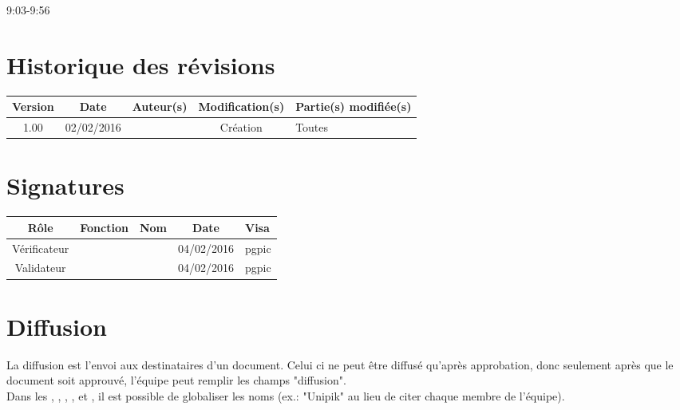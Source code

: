 \documentclass [a4paper] {article}
\begin{document}
\rhead{}
\hfill   
\hfill 	9:03-9:56 				%



\section*{Historique des révisions}
\begin{center}
			\begin{tabular}{| c | c | c | c | p{4cm} |}
				\hline
				\rowcolor{Gray}
				Version & Date & Auteur(s) & Modification(s) & Partie(s) modifiée(s)		 \\
				\hline
				1.00 & 02/02/2016 & \Pierre & Création & Toutes \\
		\hline		
			\end{tabular}
		\end{center}

\section*{Signatures}

		\begin{center}
			\begin{tabular}{| c | c | c | c | p{4cm} |}
				\hline
				\rowcolor{Gray}
				Rôle & Fonction & Nom & Date & Visa		 \\
				\hline
				Vérificateur & \RQA & \Kafui & 04/02/2016 & pgpic \\[30pt]
				\hline
				Validateur & \CP & \Sergi & 04/02/2016 & pgpic \\[30pt]	
				\hline
			\end{tabular}
		\end{center}


\section{Diffusion}
La diffusion est l'envoi aux destinataires d'un document. Celui ci ne peut être diffusé qu'après approbation, donc seulement après que le document soit approuvé, l'équipe peut remplir les champs "diffusion". \\
Dans les \DSE{}, \DSI{}, \PTV{}, \PQ{}, \PGC{} et \CDR{}, il est possible de globaliser les noms (ex.: "Unipik" au lieu de citer chaque membre de l'équipe).
\end{document}
